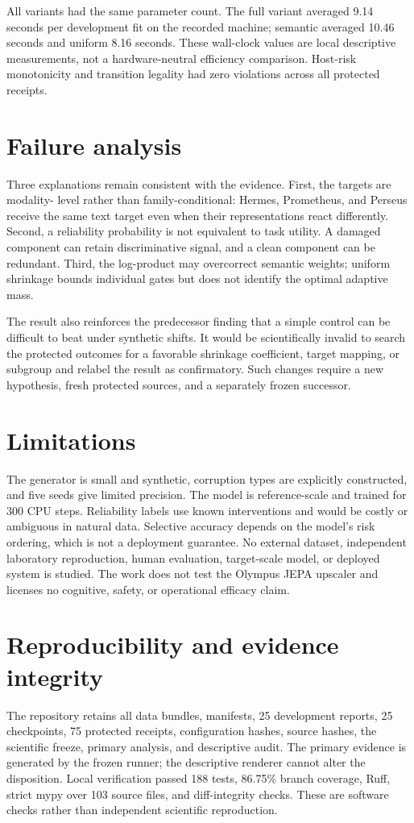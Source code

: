 \documentclass[10pt]{article}
\begin{document}
All variants had the same parameter count. The full variant averaged 9.14 seconds per
development fit on the recorded machine; semantic averaged 10.46 seconds and uniform 8.16
seconds. These wall-clock values are local descriptive measurements, not a hardware-neutral
efficiency comparison. Host-risk monotonicity and transition legality had zero violations
across all protected receipts.

\section{Failure analysis}
Three explanations remain consistent with the evidence. First, the targets are modality-
level rather than family-conditional: Hermes, Prometheus, and Perseus receive the same text
target even when their representations react differently. Second, a reliability probability
is not equivalent to task utility. A damaged component can retain discriminative signal, and
a clean component can be redundant. Third, the log-product may overcorrect semantic weights;
uniform shrinkage bounds individual gates but does not identify the optimal adaptive mass.

The result also reinforces the predecessor finding that a simple control can be difficult
to beat under synthetic shifts. It would be scientifically invalid to search the protected
outcomes for a favorable shrinkage coefficient, target mapping, or subgroup and relabel the
result as confirmatory. Such changes require a new hypothesis, fresh protected sources, and
a separately frozen successor.

\section{Limitations}
The generator is small and synthetic, corruption types are explicitly constructed, and
five seeds give limited precision. The model is reference-scale and trained for 300 CPU
steps. Reliability labels use known interventions and would be costly or ambiguous in
natural data. Selective accuracy depends on the model's risk ordering, which is not a
deployment guarantee. No external dataset, independent laboratory reproduction, human
evaluation, target-scale model, or deployed system is studied. The work does not test the
Olympus JEPA upscaler and licenses no cognitive, safety, or operational efficacy claim.

\section{Reproducibility and evidence integrity}
The repository retains all data bundles, manifests, 25 development reports, 25 checkpoints,
75 protected receipts, configuration hashes, source hashes, the scientific freeze, primary
analysis, and descriptive audit. The primary evidence is generated by the frozen runner;
the descriptive renderer cannot alter the disposition. Local verification passed 188 tests,
86.75\% branch coverage, Ruff, strict mypy over 103 source files, and diff-integrity checks.
These are software checks rather than independent scientific reproduction.
\end{document}

